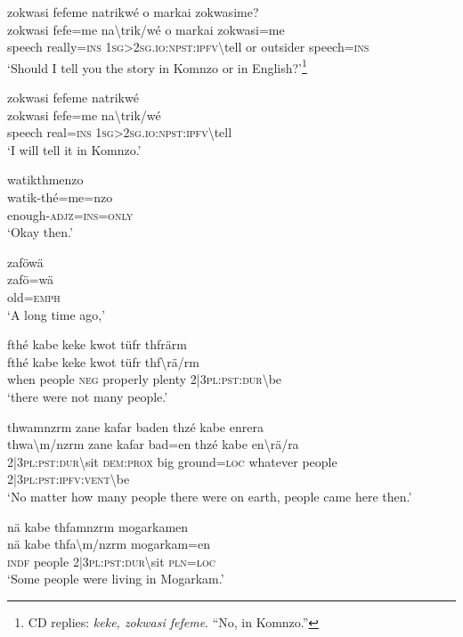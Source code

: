 \ea\label{ex:7:a4657}
zokwasi fefeme natrikwé o markai zokwasime?\\
\gll zokwasi	fefe=me	na{\textbackslash}trik/wé	o	markai	zokwasi=me\\
     speech	really=\textsc{ins}	1\textsc{sg}>2\textsc{sg}.\textsc{io}:\textsc{npst}:\textsc{ipfv}{\textbackslash}tell	or	outsider	speech=\textsc{ins}\\
\glt `Should I tell you the story in Komnzo or in English?'\footnote{CD replies: \textit{keke, zokwasi fefeme}. ``No, in Komnzo.''}
\z

\ea\label{ex:7:a4658}
zokwasi fefeme natrikwé\\
\gll zokwasi	fefe=me	na{\textbackslash}trik/wé\\
     speech	real=\textsc{ins}	1\textsc{sg}>2\textsc{sg}.\textsc{io}:\textsc{npst}:\textsc{ipfv}{\textbackslash}tell\\
\glt `I will tell it in Komnzo.'
\z

\ea\label{ex:7:a4659}
watikthmenzo\\
\gll watik-thé=me=nzo\\
     enough-\textsc{adjz}=\textsc{ins}=\textsc{only}\\
\glt `Okay then.'
\z

\ea\label{ex:7:a4660}
zaföwä\\
\gll zafö=wä\\
     old=\textsc{emph}\\
\glt `A long time ago,'
\z

\ea\label{ex:7:a4661}
fthé kabe keke kwot tüfr thfrärm\\
\gll fthé	kabe	keke	kwot	tüfr	thf{\textbackslash}rä/rm\\
     when	people	\textsc{neg}	properly	plenty	2|3\textsc{pl}:\textsc{pst}:\textsc{dur}{\textbackslash}be\\
\glt `there were not many people.'
\z

\ea\label{ex:7:a4662}
thwamnzrm zane kafar baden thzé kabe enrera\\
\gll thwa{\textbackslash}m/nzrm	zane	kafar	bad=en	thzé	kabe	en{\textbackslash}rä/ra\\
     2|3\textsc{pl}:\textsc{pst}:\textsc{dur}{\textbackslash}sit	\textsc{dem}:\textsc{prox}	big	ground=\textsc{loc}	whatever	people	2|3\textsc{pl}:\textsc{pst}:\textsc{ipfv}:\textsc{vent}{\textbackslash}be\\
\glt `No matter how many people there were on earth, people came here then.'
\z

\ea\label{ex:7:a4663}
nä kabe thfamnzrm mogarkamen\\
\gll nä	kabe	thfa{\textbackslash}m/nzrm	mogarkam=en\\
     \textsc{indf}	people	2|3\textsc{pl}:\textsc{pst}:\textsc{dur}{\textbackslash}sit	\textsc{pln}=\textsc{loc}\\
\glt `Some people were living in Mogarkam.'
\z

